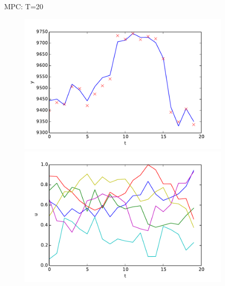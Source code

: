 \documentclass[handout]{beamer}
\begin{document}
\begin{frame}{MPC: T=20}

   \begin{figure}
    \centering
    \includegraphics[width = 0.9\textwidth, height=0.4\textheight]{figures/DAXMPC-y-2.pdf}\\
    \includegraphics[width = 0.9\textwidth, height=0.4\textheight]{figures/DAXMPC-u-2.pdf}
  \end{figure}
\end{frame}
\end{document}
